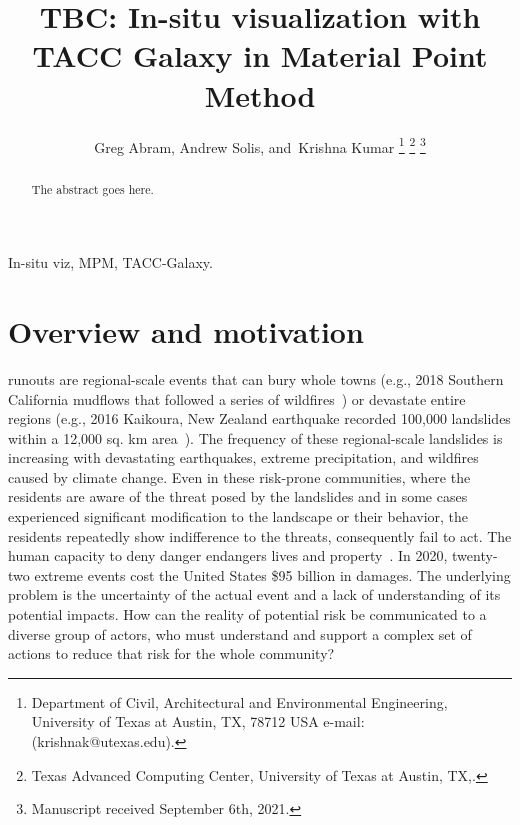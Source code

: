 \documentclass[journal]{IEEEtran}
\begin{document}
\title{TBC: In-situ visualization with TACC Galaxy in Material Point Method}

\author{Greg Abram, %
        Andrew Solis,
        and~Krishna Kumar%
\thanks{Department of Civil, Architectural and Environmental Engineering, University of Texas at Austin, TX, 78712 USA e-mail: (krishnak@utexas.edu).}%
\thanks{Texas Advanced Computing Center, University of Texas at Austin, TX,.}%
\thanks{Manuscript received September 6th, 2021.}}

%
{}


\maketitle

\begin{abstract}
The abstract goes here.
\end{abstract}

\begin{IEEEkeywords}
In-situ viz, MPM, TACC-Galaxy.
\end{IEEEkeywords}

\IEEEpeerreviewmaketitle

\section{Overview and motivation}

 runouts are regional-scale events that can bury whole towns (e.g., 2018 Southern California mudflows that followed a series of wildfires~\cite{lukashov2019post}) or devastate entire regions (e.g., 2016 Kaikoura, New Zealand earthquake recorded 100,000 landslides within a 12,000 sq. km area~\cite{dellow2017landslides}). The frequency of these regional-scale landslides is increasing with devastating earthquakes, extreme precipitation, and wildfires caused by climate change. Even in these risk-prone communities, where the residents are aware of the threat posed by the landslides and in some cases experienced significant modification to the landscape or their behavior, the residents repeatedly show indifference to the threats, consequently fail to act. The human capacity to deny danger endangers lives and property~\cite{kim2020public}. In 2020, twenty-two extreme events cost the United States \$95 billion in damages. The underlying problem is the uncertainty of the actual event and a lack of understanding of its potential impacts. How can the reality of potential risk be communicated to a diverse group of actors, who must understand and support a complex set of actions to reduce that risk for the whole community?
  
\end{document}
